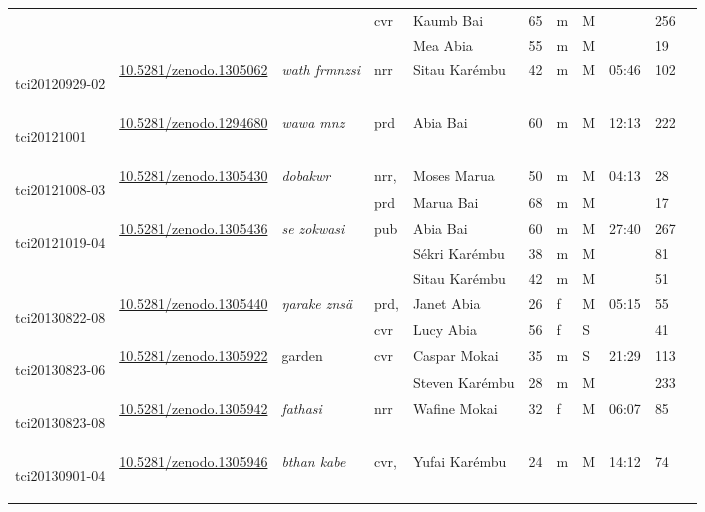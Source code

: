 \begin{landscape}
{\begin{longtable}{p{}llllllllll}
	&&&\multirow{2}{*}{cvr}& Kaumb Bai & 65 & m & M && 256\\
	&&&& Mea Abia & 55 & m & M && 19\\\hline
	\hypertarget{tci20120929-02}{tci20120929-02} &\href{https://zenodo.org/record/1305062}{10.5281/zenodo.1305062}& \emph{wath frmnzsi} & nrr & Sitau Karémbu & 42 & m & M & 05:46 & 102\\\hline
	\hypertarget{tci20121001}{tci20121001} 	&\href{https://zenodo.org/record/1294680}{10.5281/zenodo.1294680}& \emph{wawa mnz} & prd & Abia Bai & 60 & m & M & 12:13 & 222\\\hline
	\multirow{2}{*}{\hypertarget{tci20121008-03}{tci20121008-03}} &\multirow{2}{*}{\href{https://zenodo.org/record/1305430}{10.5281/zenodo.1305430}}& \multirow{2}{*}{\emph{dobakwr}} & nrr, & Moses Marua & 50 & m & M & \multirow{2}{*}{04:13} & 28\\
	&&&prd&Marua Bai & 68 & m &M &  & 17\\\hline
	\multirow{3}{*}{\hypertarget{tci20121019-04}{tci20121019-04}} &\multirow{3}{*}{\href{https://zenodo.org/record/1305436}{10.5281/zenodo.1305436}}& \multirow{3}{*}{\emph{se zokwasi}} & \multirow{3}{*}{pub} & Abia Bai & 60 & m & M & \multirow{3}{*}{27:40} & 267\\
	&&&& Sékri Karémbu & 38 & m & M && 81\\
	&&&& Sitau Karémbu & 42 & m & M && 51\\\hline
	\multirow{2}{*}{\hypertarget{tci20130822-08}{tci20130822-08}} &\multirow{2}{*}{\href{https://zenodo.org/record/1305440}{10.5281/zenodo.1305440}}& \multirow{2}{*}{\emph{ŋarake znsä}} & prd, & Janet Abia & 26 & f & M & \multirow{2}{*}{05:15} & 55\\
	&&&cvr& Lucy Abia & 56 & f & S && 41\\\hline
	\multirow{2}{*}{\hypertarget{tci20130823-06}{tci20130823-06}} &\multirow{2}{*}{\href{https://zenodo.org/record/1305922}{10.5281/zenodo.1305922}}& \multirow{2}{*}{garden} & \multirow{2}{*}{cvr} & Caspar Mokai & 35 & m & S & \multirow{2}{*}{21:29} & 113\\
	&&&&Steven Karémbu & 28 & m & M & &233\\\hline
	\hypertarget{tci20130823-08}{tci20130823-08} &\href{https://zenodo.org/record/1305942}{10.5281/zenodo.1305942}& \emph{fathasi} & nrr & Wafine Mokai & 32 & f & M & 06:07 & 85\\\hline
	\multirow{3}{*}{\hypertarget{tci20130901-04}{tci20130901-04}} &\multirow{3}{*}{\href{https://zenodo.org/record/1305946}{10.5281/zenodo.1305946}}& \multirow{3}{*}{\emph{bthan kabe}} & \multirow{2}{*}{cvr,} & Yufai Karémbu & 24 & m & M & \multirow{3}{*}{14:12} & 74\\

\end{longtable}}
\end{landscape}
